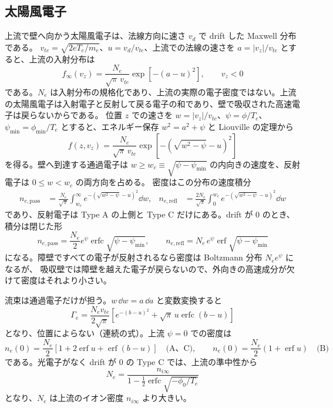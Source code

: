 \subsection{太陽風電子}
上流で壁へ向かう太陽風電子は、法線方向に速さ $v_d$ で drift した Maxwell 分布である。
$v_{te}=\sqrt{2eT_e/m_e}$、$u=v_d/v_{te}$、上流での法線の速さを $a=|v_z|/v_{te}$ とすると、上流の入射分布は
\begin{equation}
 f_\infty(v_z)=\frac{N_e}{\sqrt\pi\,v_{te}}\exp\left[-(a-u)^2\right],\qquad v_z<0
 \label{eq:sm_e_upstream}
\end{equation}
である。$N_e$ は入射分布の規格化であり、上流の実際の電子密度ではない。上流の太陽風電子は入射電子と反射して戻る電子の和であり、壁で吸収された高速電子は戻らないからである。
位置 $z$ での速さを $w=|v_z|/v_{te}$、$\psi=\phi/T_e$、$\psi_{\min}=\phi_{\min}/T_e$ とすると、エネルギー保存 $w^2=a^2+\psi$ と Liouville の定理から
\begin{equation}
 f(z,v_z)=\frac{N_e}{\sqrt\pi\,v_{te}}\exp\left[-\left(\sqrt{w^2-\psi}-u\right)^2\right]
\end{equation}
を得る。壁へ到達する通過電子は $w\ge w_c\equiv\sqrt{\psi-\psi_{\min}}$ の内向きの速度を、反射電子は $0\le w<w_c$ の両方向を占める。
密度はこの分布の速度積分
\begin{align}
 n_{e,\mathrm{pass}}&=\frac{N_e}{\sqrt\pi}\int_{w_c}^{\infty}e^{-(\sqrt{w^2-\psi}-u)^2}\dd w,&
 n_{e,\mathrm{refl}}&=\frac{2N_e}{\sqrt\pi}\int_{0}^{w_c}e^{-(\sqrt{w^2-\psi}-u)^2}\dd w
 \label{eq:sm_e_density}
\end{align}
であり、反射電子は Type A の上側と Type C だけにある。drift が 0 のとき、積分は閉じた形
\begin{equation}
 n_{e,\mathrm{pass}}=\frac{N_e}2e^{\psi}\operatorname{erfc}\sqrt{\psi-\psi_{\min}},\qquad
 n_{e,\mathrm{refl}}=N_e\,e^{\psi}\operatorname{erf}\sqrt{\psi-\psi_{\min}}
 \label{eq:sm_e_density_zero}
\end{equation}
になる。障壁ですべての電子が反射されるなら密度は Boltzmann 分布 $N_ee^{\psi}$ になるが、
吸収壁では障壁を越えた電子が戻らないので、外向きの高速成分が欠けて密度はそれより小さい。

流束は通過電子だけが担う。$w\,\dd w=a\,\dd a$ と変数変換すると
\begin{equation}
 \Gamma_e=\frac{N_ev_{te}}{2\sqrt\pi}\left[e^{-(b-u)^2}+\sqrt\pi\,u\operatorname{erfc}(b-u)\right]
 \label{eq:sm_e_flux}
\end{equation}
となり、位置によらない（連続の式）。上流 $\psi=0$ での密度は
\begin{equation}
 n_e(0)=\frac{N_e}2\left[1+2\operatorname{erf}u+\operatorname{erf}(b-u)\right]\quad\text{(A、C)},\qquad
 n_e(0)=\frac{N_e}2\left(1+\operatorname{erf}u\right)\quad\text{(B)}
 \label{eq:sm_e_upstream_density}
\end{equation}
である。光電子がなく drift が 0 の Type C では、上流の準中性から
\begin{equation}
 N_e=\frac{n_{i\infty}}{1-\tfrac12\operatorname{erfc}\sqrt{-\phi_0/T_e}}
 \label{eq:upstream_density}
\end{equation}
となり、$N_e$ は上流のイオン密度 $n_{i\infty}$ より大きい。

